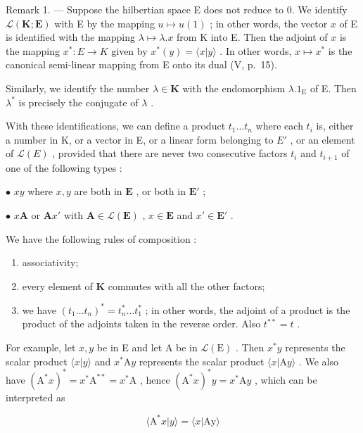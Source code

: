 Remark 1. --- Suppose the hilbertian space E does not reduce to 0. We identify \(\mathcal{L}(\mathbf{K};\mathbf{E})\) with E by the mapping \(u\mapsto u(1)\) ; in other words, the vector \(x\) of E is identified with the mapping \(\lambda\mapsto\lambda.x\) from K into E. Then the adjoint of \(x\) is the mapping \(x^{*}:E\to K\) given by \(x^{*}(y)=\langle x|y\rangle\) . In other words, \(x\mapsto x^{*}\) is the canonical semi-linear mapping from E onto its dual (V, p.~15).

Similarly, we identify the number \(\lambda \in \mathbf{K}\) with the endomorphism \(\lambda. 1_{\mathrm{E}}\) of E. Then \(\lambda^{*}\) is precisely the conjugate of \(\lambda\) .

With these identifications, we can define a product \(t_{1} \ldots t_{n}\) where each \(t_{i}\) is, either a number in K, or a vector in E, or a linear form belonging to \(E'\) , or an element of \(\mathcal{L}(E)\) , provided that there are never two consecutive factors \(t_{i}\) and \(t_{i+1}\) of one of the following types :

\(\bullet\) \(xy\) where \(x, y\) are both in \(\mathbf{E}\) , or both in \(\mathbf{E}'\) ;

\(\bullet\) \(x\mathbf{A}\) or \(\mathbf{A}x'\) with \(\mathbf{A} \in \mathcal{L}(\mathbf{E})\) , \(x \in \mathbf{E}\) and \(x' \in \mathbf{E}'\) .

We have the following rules of composition :

\begin{enumerate}
\def\labelenumi{\alph{enumi})}
\item
  associativity;
\item
  every element of \(\mathbf{K}\) commutes with all the other factors;
\item
  we have \((t_1 \ldots t_n)^* = t_n^* \ldots t_1^*\) ; in other words, the adjoint of a product is the product of the adjoints taken in the reverse order. Also \(t^{**} = t\) .
\end{enumerate}

For example, let \(x, y\) be in E and let A be in \(\mathcal{L}(\mathrm{E})\) . Then \(x^{*}y\) represents the scalar product \(\langle x|y\rangle\) and \(x^{*}\mathrm{A}y\) represents the scalar product \(\langle x|\mathrm{A}y\rangle\) . We also have \((\mathrm{A}^{*}x)^{*} = x^{*}\mathrm{A}^{**} = x^{*}\mathrm{A}\) , hence \((\mathrm{A}^{*}x)^{*}y = x^{*}\mathrm{A}y\) , which can be interpreted as

\[
\langle \mathrm{A} ^ {*} x | y \rangle = \langle x | \mathrm{Ay} \rangle
\]

